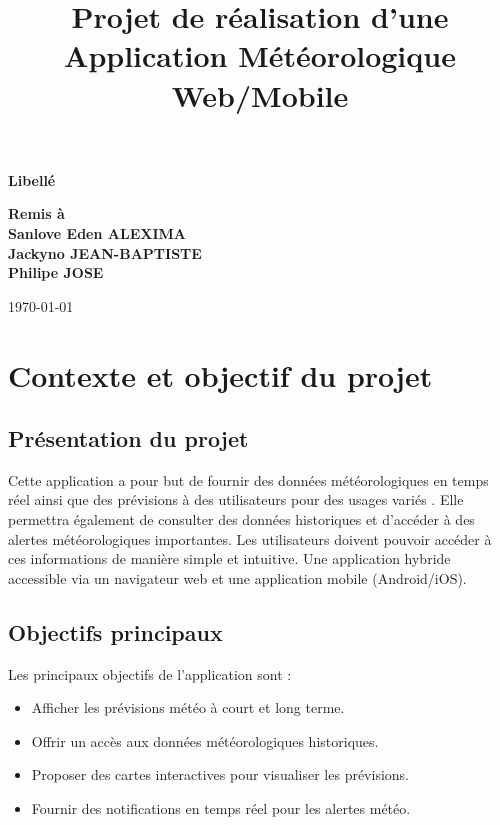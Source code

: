 \documentclass[a4paper,12pt]{article}
\title{Projet de réalisation d'une Application Météorologique Web/Mobile }
\author{}
\date{}
\begin{document}
\maketitle

\vfill %
\begin{center}
    \Huge \textbf{Libellé} %
\end{center}
\vfill %

\begin{center}
    \textbf{Remis à} \\[1em] %
    \textbf{Sanlove Eden ALEXIMA} \\
    \textbf{Jackyno JEAN-BAPTISTE} \\
    \textbf{Philipe JOSE}
\end{center}

	
\begin{center}
    \today
\end{center}


\clearpage %

\tableofcontents %
\newpage %

\section{Contexte et objectif du projet}
\subsection{Présentation du projet}
Cette application a pour but de fournir des données météorologiques en temps réel ainsi que des prévisions à des utilisateurs pour des usages variés . 
Elle permettra également de consulter des données historiques et d'accéder à des alertes météorologiques importantes. Les utilisateurs doivent pouvoir accéder à ces informations de manière simple et intuitive. Une application hybride accessible via un navigateur web et une application mobile (Android/iOS).

\subsection{Objectifs principaux}
Les principaux objectifs de l'application sont :
\begin{itemize}
    \item Afficher les prévisions météo à court et long terme.
    \item Offrir un accès aux données météorologiques historiques.
    \item Proposer des cartes interactives pour visualiser les prévisions.
    \item Fournir des notifications en temps réel pour les alertes météo.
\end{itemize}
\end{document}
